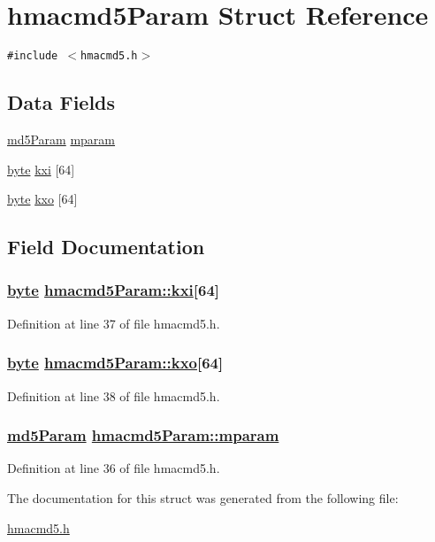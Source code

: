 \hypertarget{structhmacmd5Param}{
\section{hmacmd5Param Struct Reference}
\label{structhmacmd5Param}
}
{\tt \#include $<$hmacmd5.h$>$}

\subsection*{Data Fields}
\begin{CompactItemize}
\item 
\hyperlink{structmd5Param}{md5Param} \hyperlink{structhmacmd5Param_o0}{mparam}
\item 
\hyperlink{beecrypt_8api_8h_a3}{byte} \hyperlink{structhmacmd5Param_o1}{kxi} \mbox{[}64\mbox{]}
\item 
\hyperlink{beecrypt_8api_8h_a3}{byte} \hyperlink{structhmacmd5Param_o2}{kxo} \mbox{[}64\mbox{]}
\end{CompactItemize}


\subsection{Field Documentation}
\hypertarget{structhmacmd5Param_o1}{
\subsubsection[kxi]{\setlength{\rightskip}{0pt plus 5cm}\hyperlink{beecrypt_8api_8h_a3}{byte} \hyperlink{structhmacmd5Param_o1}{hmacmd5Param::kxi}\mbox{[}64\mbox{]}}}
\label{structhmacmd5Param_o1}


Definition at line 37 of file hmacmd5.h.\hypertarget{structhmacmd5Param_o2}{
\subsubsection[kxo]{\setlength{\rightskip}{0pt plus 5cm}\hyperlink{beecrypt_8api_8h_a3}{byte} \hyperlink{structhmacmd5Param_o2}{hmacmd5Param::kxo}\mbox{[}64\mbox{]}}}
\label{structhmacmd5Param_o2}


Definition at line 38 of file hmacmd5.h.\hypertarget{structhmacmd5Param_o0}{
\subsubsection[mparam]{\setlength{\rightskip}{0pt plus 5cm}\hyperlink{structmd5Param}{md5Param} \hyperlink{structhmacmd5Param_o0}{hmacmd5Param::mparam}}}
\label{structhmacmd5Param_o0}


Definition at line 36 of file hmacmd5.h.

The documentation for this struct was generated from the following file:\begin{CompactItemize}
\item 
\hyperlink{hmacmd5_8h}{hmacmd5.h}\end{CompactItemize}
